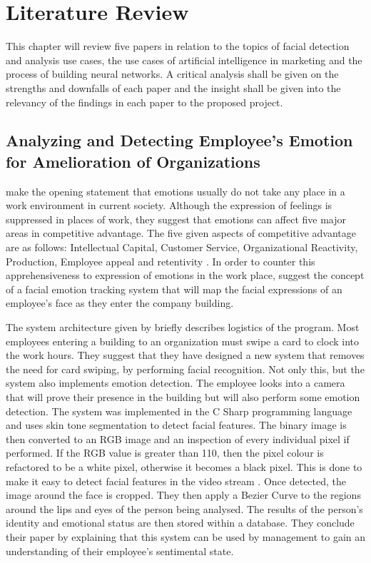 \chapter{Literature Review}
This chapter will review five papers in relation to the topics of facial detection and analysis use cases, the use cases of artificial intelligence in marketing and the process of building neural networks. A critical analysis shall be given on the strengths and downfalls of each paper and the insight shall be given into the relevancy of the findings in each paper to the proposed project.

\section{Analyzing and Detecting Employee's Emotion for Amelioration of Organizations}

\citeauthor{SUBHASHINI} make the opening statement that emotions usually do not take any place in a work environment in current society. Although the expression of feelings is suppressed in places of work, they suggest that emotions can affect five major areas in competitive advantage. The five given aspects of competitive advantage are as follows: Intellectual Capital, Customer Service, Organizational Reactivity, Production, Employee appeal and retentivity \citep{SUBHASHINI}. In order to counter this apprehensiveness to expression of emotions in the work place, \citeauthor{SUBHASHINI} suggest the concept of a facial emotion tracking system that will map the facial expressions of an employee's face as they enter the company building. 

The system architecture given by \citeauthor{SUBHASHINI} briefly describes logistics of the program. Most employees entering a building to an organization must swipe a card to clock into the work hours. They suggest that they have designed a new system that removes the need for card swiping, by performing facial recognition. Not only this, but the system also implements emotion detection. The employee looks into a camera that will prove their presence in the building but will also perform some emotion detection. The system was implemented in the C Sharp programming language and uses skin tone segmentation to detect facial features. The binary image is then converted to an RGB image and an inspection of every individual pixel if performed. If the RGB value is greater than 110, then the pixel colour is refactored to be a white pixel, otherwise it becomes a black pixel. This is done to make it easy to detect facial features in the video stream \citep{SUBHASHINI}. Once detected, the image around the face is cropped. They then apply a Bezier Curve to the regions around the lips and eyes of the person being analysed. The results of the person's identity and emotional status are then stored within a database. They conclude their paper by explaining that this system can be used by management to gain an understanding of their employee's sentimental state. 
\\

